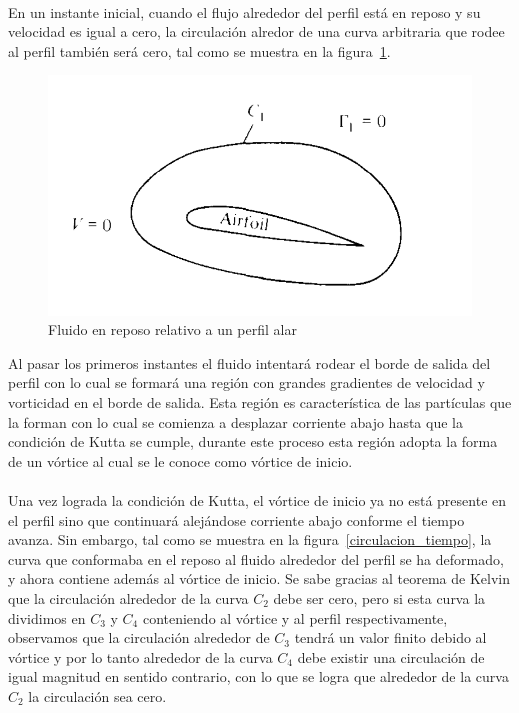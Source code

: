 \documentclass[letterpaper, openright, 12pt]{book}
\begin{document}
    \paragraph*{}
        En un instante inicial, cuando el flujo alrededor del perfil está en
        reposo y su velocidad es igual a cero, la circulación alredor de una
        curva arbitraria que rodee al perfil también será cero, tal como se
        muestra en la figura~\ref{circulacion_reposo}.

        \begin{figure}[htbp!]
            \centering
            \includegraphics[keepaspectratio, width=115mm]{./img/circulacion_reposo}
            \caption[Fluido en reposo relativo a un perfil alar]{Fluido en
                reposo relativo a un perfil alar\cite{anderson_fundamentals}}
            \label{circulacion_reposo}
        \end{figure}

        Al pasar los primeros instantes el fluido intentará rodear el borde de
        salida del perfil con lo cual se formará una región con grandes
        gradientes de velocidad y vorticidad en el borde de salida. Esta región
        es característica de las partículas que la forman con lo cual se
        comienza a desplazar corriente abajo hasta que la condición de Kutta se
        cumple, durante este proceso esta región adopta la forma de un vórtice
        al cual se le conoce como vórtice de inicio.

    \paragraph*{}
        Una vez lograda la condición de Kutta, el vórtice de inicio ya no está
        presente en el perfil sino que continuará alejándose corriente abajo
        conforme el tiempo avanza. Sin embargo, tal como se muestra en la
        figura~\ref{circulacion_tiempo}, la curva que conformaba en el reposo
        al fluido alrededor del perfil se ha deformado, y ahora contiene además
        al vórtice de inicio. Se sabe gracias al teorema de Kelvin que la
        circulación alrededor de la curva $C_2$ debe ser cero, pero si esta
        curva la dividimos en $C_3$ y $C_4$ conteniendo al vórtice y al perfil
        respectivamente, observamos que la circulación alrededor de $C_3$
        tendrá un valor finito debido al vórtice y por lo tanto alrededor de la
        curva $C_4$ debe existir una circulación de igual magnitud en sentido
        contrario, con lo que se logra que alrededor de la curva $C_2$ la
        circulación sea cero.
\end{document}
